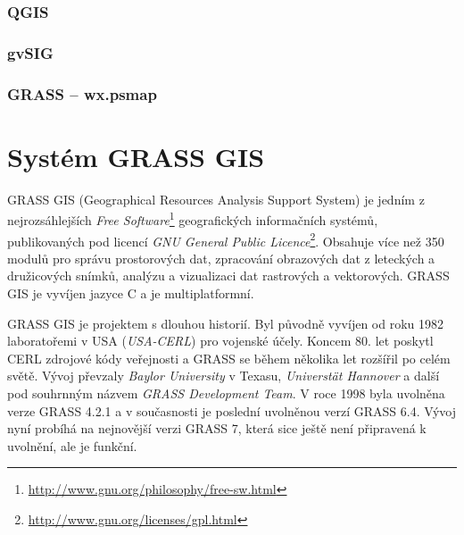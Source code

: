 \documentclass[a4paper,12pt,draft]{article}
\begin{document}
\subsubsection{QGIS}

\subsubsection{gvSIG}

\subsubsection{GRASS -- wx.psmap}


\section{Systém GRASS GIS}
\label{sec:grass}
GRASS GIS (Geographical Resources Analysis Support System) je jedním z nejrozsáhlejších \emph{Free Software}\footnote{\url{http://www.gnu.org/philosophy/free-sw.html}} geografických informačních systémů, publikovaných pod licencí \emph{GNU General Public Licence}\footnote{\url{http://www.gnu.org/licenses/gpl.html}}. Obsahuje více než 350 modulů pro správu prostorových dat, zpracování obrazových dat z leteckých a družicových snímků, analýzu a vizualizaci dat rastrových a vektorových. GRASS GIS je vyvíjen jazyce C a je multiplatformní.

GRASS GIS je projektem s dlouhou historií. Byl původně vyvíjen od roku 1982 laboratořemi v USA (\emph{USA-CERL}) pro vojenské účely. Koncem 80. let poskytl CERL zdrojové kódy veřejnosti a GRASS se během několika let rozšířil po celém světě. Vývoj převzaly \emph{Baylor University} v Texasu, \emph{Universtät Hannover} a další pod souhrnným názvem \emph{GRASS Development Team}. V roce 1998 byla uvolněna verze GRASS 4.2.1 a v současnosti je poslední uvolněnou verzí GRASS 6.4. Vývoj nyní probíhá na nejnovější verzi GRASS 7, která sice ještě není připravená k uvolnění, ale je funkční. 
\end{document}
